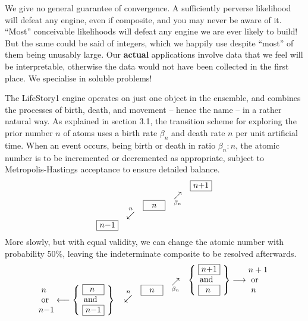 We give no general guarantee of convergence.
A sufficiently perverse likelihood will defeat any engine, even if composite, and you may never be aware of it.
``Most'' conceivable likelihoods will defeat any engine we are ever likely to build!
But the same could be said of integers, which we happily use despite ``most'' of them being unusably large.
Our {\bf actual} applications involve data that we feel will be interpretable, otherwise the data would not have been collected in the first place.
We specialise in soluble problems!

\bigskip
{}
\smallskip

The LifeStory1 engine operates on just one object in the ensemble,
and combines the processes of birth, death, and movement -- hence the name -- in a rather natural way.
As explained in section 3.1, the transition scheme for exploring the prior number $n$ of atoms uses a birth rate $\beta_n$ and death rate $n$ per unit artificial time.
When an event occurs, being birth or death in ratio $\beta_n : n$, the atomic number is to be incremented or decremented as appropriate, 
subject to Metropolis-Hastings acceptance to ensure detailed balance.
$$
           \raise  0pt\vbox{\offinterlineskip \hrule \halign{\hfil #\hfil\strut\cr \vrule\    $n-$1     \vrule \cr} \hrule}
\hskip10pt \raise 16pt\DeathArrow \hskip10pt 
           \raise 24pt\vbox{\offinterlineskip \hrule \halign{\hfil #\hfil\strut\cr \vrule\ \ \ $n$\ \ \ \vrule \cr} \hrule}
\hskip10pt \raise 32pt\BirthArrow \hskip10pt
           \raise 48pt\vbox{\offinterlineskip \hrule \halign{\hfil #\hfil\strut\cr \vrule\    $n+$1     \vrule \cr} \hrule}
$$
More slowly, but with equal validity, we can change the atomic number with probability 50\%, leaving the indeterminate composite to be resolved afterwards.
$$
\hbox{\lower 12pt \vbox{\hbox{\ $n$} \hbox{\ or} \hbox{$n-$1} }}
\longleftarrow
\left\{\ \lower 16pt\vbox{\offinterlineskip \hrule \halign{  \hfil # \hfil                    \strut\cr
                                                           \vrule\ \phantom{1}$n\phantom{-}$ \vrule \cr
                                   \noalign{\hrule}         and                                     \cr
                                   \noalign{\hrule}        \vrule\ $n-$1 \vrule                     \cr }
                                            \hrule
                         }\ \right\}
\hskip10pt \raise 2pt\DeathArrow \hskip10pt
\raise  8pt\vbox{\offinterlineskip \hrule \halign{   \hfil # \hfil      \strut\cr
                                                  \vrule\ \ \ $n$\ \ \ \vrule \cr }
                                   \hrule
                }
\hskip10pt \raise 14pt\BirthArrow \hskip10pt
\raise 24pt\hbox{$
\left\{\ \lower 16pt\vbox{\offinterlineskip \hrule \halign{  \hfil # \hfil                    \strut\cr
                                                           \vrule\ $n+$1 \vrule                     \cr
                                   \noalign{\hrule}         and                                     \cr
                                   \noalign{\hrule}        \vrule\ \phantom{1}$n\phantom{+}$ \vrule \cr }
                                            \hrule }
\ \right\}
\longrightarrow
\hbox{\lower 12pt \vbox{\hbox{$n+1$} \hbox{\ or} \hbox{\ $n$} }
}
$}
$$
